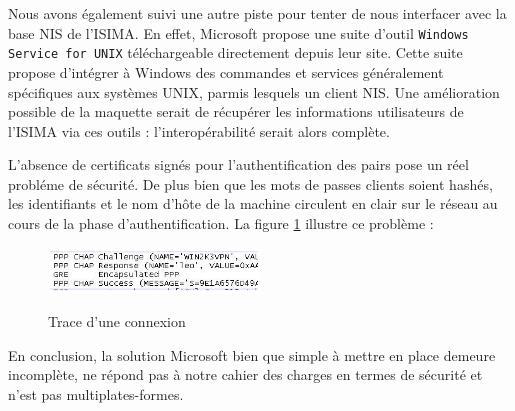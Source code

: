 Nous avons également suivi une autre piste pour tenter de nous interfacer avec la base NIS de l'ISIMA. En effet, Microsoft propose une suite d'outil \verb|Windows Service for UNIX| téléchargeable directement depuis leur site. Cette suite propose d'intégrer à Windows des commandes et services généralement spécifiques aux systèmes UNIX, parmis lesquels un client NIS. Une amélioration possible de la maquette serait de récupérer les informations utilisateurs de l'ISIMA via ces outils : l'interopérabilité serait alors complète.

L'absence de certificats signés pour l'authentification des pairs pose un réel probléme de sécurité. De plus bien que les mots de passes clients soient hashés, les identifiants et le nom d'hôte de la machine circulent en clair sur le réseau au cours de la phase d'authentification. La figure \ref{VPN_CONNEXION} illustre ce problème :

\begin{figure}[H]
	\begin{center}
		\includegraphics[width=0.5\textwidth]{partie_2/screen_windows/connexion.png}\\
	\end{center}
	\caption{Trace d'une connexion}
	\label{VPN_CONNEXION}
\end{figure}




En conclusion, la solution Microsoft bien que simple à mettre en place demeure incomplète, ne répond pas à notre cahier des charges en termes de sécurité et n'est pas multiplates-formes.
